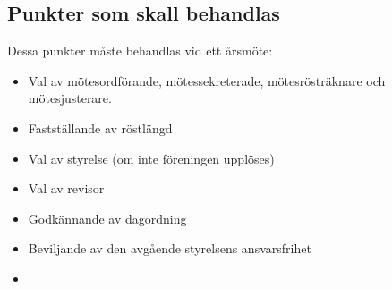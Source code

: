 \documentclass{article}
\begin{document}
\subsection{Punkter som skall behandlas}
Dessa punkter måste behandlas vid ett årsmöte:
\begin{itemize}[noitemsep]
    \item Val av mötesordförande, mötessekreterade, mötesrösträknare och mötesjusterare.
    \item Fastställande av röstlängd
    \item Val av styrelse (om inte föreningen upplöses)
    \item Val av revisor
    \item Godkännande av dagordning
    \item Beviljande av den avgående styrelsens ansvarsfrihet
    \item 
\end{itemize}
\end{document}
